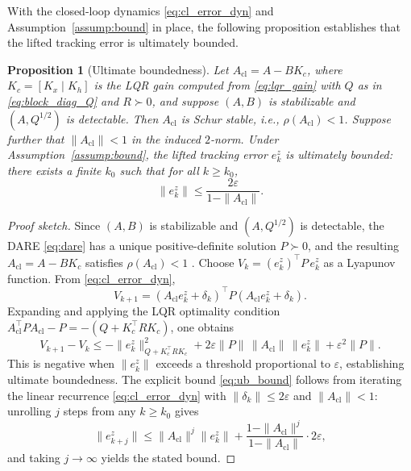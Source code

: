 \documentclass[journal]{IEEEtran}
\newtheorem{proposition}{Proposition}
\begin{document}
With the closed-loop dynamics \eqref{eq:cl_error_dyn} and Assumption~\ref{assump:bound} in place, the following proposition establishes that the lifted tracking error is ultimately bounded.

\begin{proposition}[Ultimate boundedness]
\label{prop:ub}
Let $A_{\mathrm{cl}} = A - BK_c$, where $K_c = [K_x\;|\;K_h]$ is the LQR gain computed from \eqref{eq:lqr_gain} with $Q$ as in \eqref{eq:block_diag_Q} and $R \succ 0$, and suppose $(A,B)$ is stabilizable and $(A,Q^{1/2})$ is detectable. Then $A_{\mathrm{cl}}$ is Schur stable, i.e., $\rho(A_{\mathrm{cl}}) < 1$. Suppose further that $\|A_{\mathrm{cl}}\| < 1$ in the induced $2$-norm. Under Assumption~\ref{assump:bound}, the lifted tracking error $e_k^z$ is ultimately bounded: there exists a finite $k_0$ such that for all $k \geq k_0$,
\begin{equation}
    \|e_k^z\| \leq \frac{2\varepsilon}{1 - \|A_{\mathrm{cl}}\|}.
    \label{eq:ub_bound}
\end{equation}
\end{proposition}

\begin{proof}[Proof sketch]
Since $(A,B)$ is stabilizable and $(A,Q^{1/2})$ is detectable, the DARE \eqref{eq:dare} has a unique positive-definite solution $P \succ 0$, and the resulting $A_{\mathrm{cl}} = A - BK_c$ satisfies $\rho(A_{\mathrm{cl}}) < 1$ \cite{korda2018linear}. Choose $V_k = (e_k^z)^\top P\, e_k^z$ as a Lyapunov function. From \eqref{eq:cl_error_dyn},
\begin{equation}
    V_{k+1} = (A_{\mathrm{cl}} e_k^z + \delta_k)^\top P (A_{\mathrm{cl}} e_k^z + \delta_k).
\end{equation}
Expanding and applying the LQR optimality condition $A_{\mathrm{cl}}^\top P A_{\mathrm{cl}} - P = -(Q + K_c^\top R K_c)$, one obtains
\begin{equation}
    V_{k+1} - V_k \leq -\|e_k^z\|_{Q+K_c^\top R K_c}^2 + 2\varepsilon \|P\|\,\|A_{\mathrm{cl}}\|\,\|e_k^z\| + \varepsilon^2 \|P\|.
\end{equation}
This is negative when $\|e_k^z\|$ exceeds a threshold proportional to $\varepsilon$, establishing ultimate boundedness. The explicit bound \eqref{eq:ub_bound} follows from iterating the linear recurrence \eqref{eq:cl_error_dyn} with $\|\delta_k\| \leq 2\varepsilon$ and $\|A_{\mathrm{cl}}\| < 1$: unrolling $j$ steps from any $k \geq k_0$ gives
\begin{equation}
    \|e_{k+j}^z\| \leq \|A_{\mathrm{cl}}\|^j \|e_k^z\| + \frac{1 - \|A_{\mathrm{cl}}\|^j}{1 - \|A_{\mathrm{cl}}\|}\cdot 2\varepsilon,
\end{equation}
and taking $j\to\infty$ yields the stated bound.
\end{proof}
\end{document}
